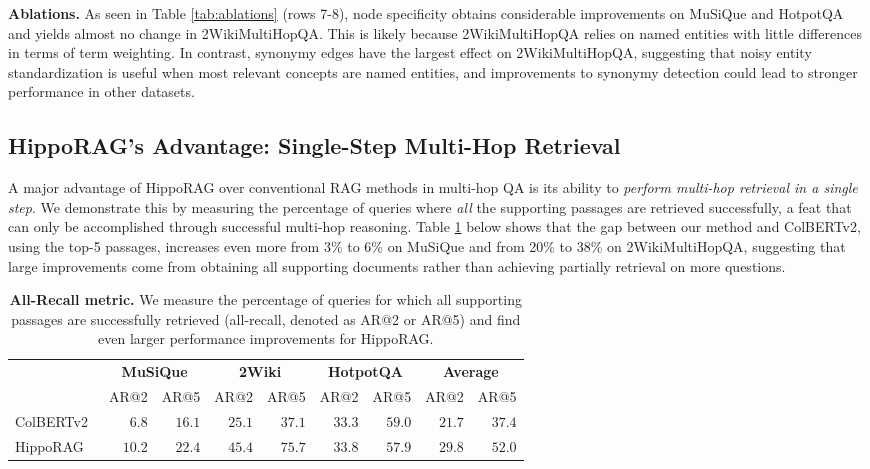 \documentclass{article}
\begin{document}
\noindent \textbf{Ablations.} As seen in Table \ref{tab:ablations} (rows 7-8), node specificity obtains considerable improvements on MuSiQue and HotpotQA and yields almost no change in 2WikiMultiHopQA. This is likely because 2WikiMultiHopQA relies on named entities with little differences in terms of term weighting. In contrast, synonymy edges have the largest effect on 2WikiMultiHopQA, suggesting that noisy entity standardization is useful when most relevant concepts are named entities, and improvements to synonymy detection could lead to stronger performance in other datasets. 

\subsection{HippoRAG's Advantage: Single-Step Multi-Hop Retrieval}

A major advantage of HippoRAG over conventional RAG methods in multi-hop QA is its ability to \textit{perform multi-hop retrieval in a single step}.
We demonstrate this by measuring the percentage of queries where \textit{all} the supporting passages are retrieved successfully, a feat that can only be accomplished through successful multi-hop reasoning.
Table \ref{tab:all_single_retrieve} below shows that the gap between our method and ColBERTv2, using the top-\num{5} passages, increases even more from \num{3}\% to \num{6}\% on MuSiQue and from \num{20}\% to \num{38}\% on 2WikiMultiHopQA, suggesting that large improvements come from obtaining all supporting documents rather than achieving partially retrieval on more questions.

\begin{table}[!ht]
\small
  \caption{\textbf{All-Recall metric.} We measure the percentage of queries for which all supporting passages are successfully retrieved (all-recall, denoted as AR@2 or AR@5) and find even larger performance improvements for HippoRAG.}
  \label{tab:all_single_retrieve}
  \centering
\begin{tabular}{@{}lrrrrrr|rr@{}}
\toprule
             & \multicolumn{2}{c}{\textbf{MuSiQue}} & \multicolumn{2}{c}{\textbf{2Wiki}} & \multicolumn{2}{c}{\textbf{HotpotQA}} & \multicolumn{2}{c}{\textbf{Average}}  \\ \cmidrule(l){2-9} 
             & AR@2          & AR@5          & AR@2             & AR@5             & AR@2           & AR@5 & AR@2 & AR@5                    \\ \midrule
ColBERTv2~\cite{colbertv2} &  $6.8$ & $16.1$   & $25.1$ & $37.1$ & $33.3$ & $59.0$ & $21.7$ & $37.4$      \\ 
HippoRAG &  $10.2$ & $22.4$ & $45.4$ & $75.7$ & $33.8$ & $57.9$ & $29.8$ & $52.0$\\ \bottomrule
\end{tabular}
\end{table}
\end{document}
